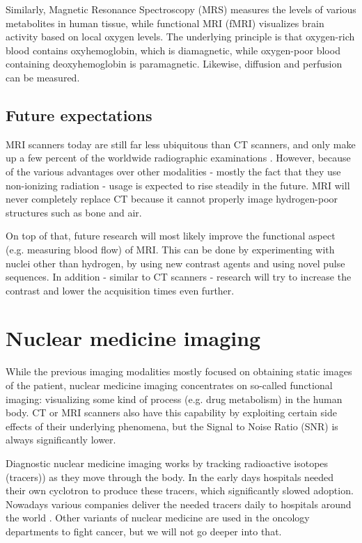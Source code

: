 
Similarly, Magnetic Resonance Spectroscopy (MRS) measures the levels of various
metabolites in human tissue, while functional MRI (fMRI) visualizes brain
activity based on local oxygen levels. The underlying principle is that
oxygen-rich blood contains oxyhemoglobin, which is diamagnetic, while
oxygen-poor blood containing deoxyhemoglobin is paramagnetic. Likewise,
diffusion and perfusion can be measured.

\subsection{Future expectations}
MRI scanners today are still far less ubiquitous than CT scanners, and only make
up a few percent of the worldwide radiographic examinations \cite{oecdhealth}.
However, because of the various advantages over other modalities - mostly the
fact that they use non-ionizing radiation - usage is expected to rise steadily
in the future. MRI will never completely replace CT because it cannot properly
image hydrogen-poor structures such as bone and air.

On top of that, future research will most likely improve the functional aspect
(e.g. measuring blood flow) of MRI. This can be done by experimenting with
nuclei other than hydrogen, by using new contrast agents and using novel pulse
sequences. In addition - similar to CT scanners - research will try to increase
the contrast and lower the acquisition times even further.

\section{Nuclear medicine imaging}
While the previous imaging modalities mostly focused on obtaining static images
of the patient, nuclear medicine imaging concentrates on so-called functional
imaging: visualizing some kind of process (e.g. drug metabolism) in the human
body. CT or MRI scanners also have this capability by exploiting certain side
effects of their underlying phenomena, but the Signal to Noise Ratio (SNR) is
always significantly lower.

Diagnostic nuclear medicine imaging works by tracking radioactive isotopes
(tracers)) as they move through the body. In the early days hospitals needed
their own cyclotron to produce these tracers, which significantly slowed
adoption. Nowadays various companies deliver the needed tracers daily to
hospitals around the world \cite{petreview}. Other variants of nuclear medicine
are used in the oncology departments to fight cancer, but we will not go deeper
into that.

